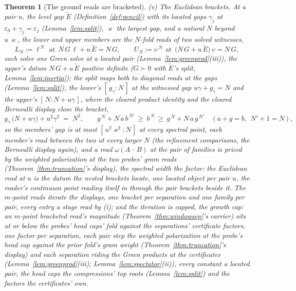 \documentclass[11pt]{article}
\newtheorem{theorem}{Theorem}
\theoremstyle{definition}
\begin{document}
\begin{theorem}[The ground reads are bracketed]
\emph{(v) The Euclidean brackets.} At a pair $u$, the level gap
$\tilde E$ (Definition~\ref{def:pencil}) with its located gaps
$\gamma_j$ at $\varepsilon_0+\gamma_j=\varepsilon_j$
(Lemma~\ref{lem:split}), $\varkappa$ the largest gap, and a
natural $N$ beyond $u\,\varkappa$, the \emph{lower} and
\emph{upper} members are the $N$-fold reads of two solved witnesses,
\[
L_N:=\ell^{\,N}\ \ \text{at}\ \ N\,G\,\ell+u\,\tilde E=N\,G,
\qquad
U_N:=\upsilon^{\,N}\ \ \text{at}\ \ \big(N\,G+u\,\tilde E\big)\,\upsilon=N\,G,
\]
each solve one Green solve at a located pair
(Lemma~\ref{lem:greenprod}(iii)), the upper's datum $N\,G+u\,\tilde
E$ positive definite ($G\succ0$ with
$\tilde E$'s split, Lemma~\ref{lem:inertia}); the split maps both to
diagonal reads at the gaps
(Lemma~\ref{lem:split}), the lower's $[\,g_\gamma:N\,]$ at the
witnessed gap $u\gamma+g_\gamma=N$ and the upper's
$[\,N:N+u\gamma\,]$, where the cleared product identity and the
cleared Bernoulli display close the bracket,
\[
g_\gamma\,\big(N+u\gamma\big)+u^2\gamma^2\;=\;N^2,
\qquad
g^{\,N}+N\,a\,b^{\,N'}\ \ge\ b^{\,N}\ \ge\ g^{\,N}+N\,a\,g^{\,N'}
\quad(a+g=b,\ \ N'+1=N),
\]
so the members' gap is at most $[\,u^2\varkappa^2:N\,]$ at every
spectral point, each member's read between the two at every larger
$N$ (the refinement comparisons, the Bernoulli display again), and a
read $\omega(A\,\cdot\,B)$ at the pair of families is priced by the
weighted polarization at the two probes' gram reads
(Theorem~\ref{thm:truncation}'s display), the spectral width the
factor: the \emph{Euclidean read} at $u$ is the datum the
nested brackets locate, one located object per pair $u$, the reader's
continuum point reading itself in through the pair brackets
beside it. The $m$-point reads iterate the
displays, one bracket per separation and one family per pair, every
entry a stage read by (i); and the iteration is capped, the
\emph{growth cap}: an $m$-point bracketed read's magnitude
(Theorem~\ref{thm:windowsep}'s carrier) sits at or below the
probes' head caps' fold against the separations' certificate
factors, one factor per separation, each pair step the weighted
polarization at the probe's head cap against the prior fold's
gram weight (Theorem~\ref{thm:truncation}'s display) and each
separation riding the Green products at the certificates
(Lemma~\ref{lem:greenprod}(iii); Lemma~\ref{lem:spectator}(ii)),
every constant a located pair, the head caps the compressions'
top roots (Lemma~\ref{lem:split}) and the factors the
certificates' own.


\end{theorem}
\end{document}
